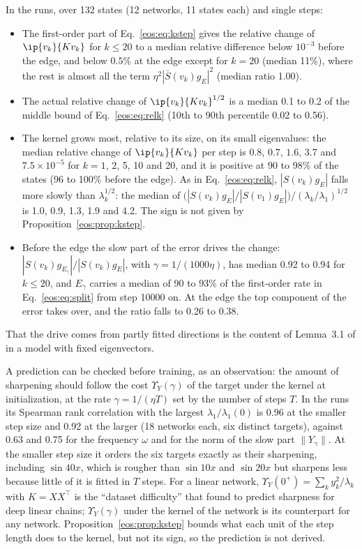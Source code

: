 In the runs, over 132 states (12 networks, 11 states each) and single steps:
\begin{itemize}
\item The first-order part of Eq.~\eqref{eos:eq:kstep} gives the relative change of $\ip{v_k}{Kv_k}$ for $k\le20$ to a median relative difference below $10^{-3}$ before the edge, and below $0.5\%$ at the edge except for $k = 20$ (median 11\%), where the rest is almost all the term $\eta^2|\bar S(v_k)g_E|^2$ (median ratio 1.00).
\item The actual relative change of $\ip{v_k}{Kv_k}^{1/2}$ is a median 0.1 to 0.2 of the middle bound of Eq.~\eqref{eos:eq:relk} (10th to 90th percentile 0.02 to 0.56).
\item The kernel grows most, relative to its size, on its small eigenvalues: the median relative change of $\ip{v_k}{Kv_k}$ per step is $0.8$, $0.7$, $1.6$, $3.7$ and $7.5\times10^{-5}$ for $k = 1$, 2, 5, 10 and 20, and it is positive at 90 to 98\% of the states (96 to 100\% before the edge). As in Eq.~\eqref{eos:eq:relk}, $|S(v_k)g_E|$ falls more slowly than $\lambda_k^{1/2}$: the median of $\big(|S(v_k)g_E|/|S(v_1)g_E|\big)\big/(\lambda_k/\lambda_1)^{1/2}$ is 1.0, 0.9, 1.3, 1.9 and 4.2. The sign is not given by Proposition~\ref{eos:prop:kstep}.
\item Before the edge the slow part of the error drives the change: $|S(v_k)g_{E_\gamma}|/|S(v_k)g_E|$, with $\gamma = 1/(1000\eta)$, has median 0.92 to 0.94 for $k\le20$, and $E_\gamma$ carries a median of 90 to 93\% of the first-order rate in Eq.~\eqref{eos:eq:split} from step 10000 on. At the edge the top component of the error takes over, and the ratio falls to 0.26 to 0.38.
\end{itemize}
That the drive comes from partly fitted directions is the content of Lemma~3.1 of \cite{liwangli2022} in a model with fixed eigenvectors.

A prediction can be checked before training, as an observation: the amount of sharpening should follow the cost $\Upsilon_Y(\gamma)$ of the target under the kernel at initialization, at the rate $\gamma = 1/(\eta T)$ set by the number of steps $T$.
In the runs its Spearman rank correlation with the largest $\lambda_1/\lambda_1(0)$ is 0.96 at the smaller step size and 0.92 at the larger (18 networks each, six distinct targets), against 0.63 and 0.75 for the frequency $\omega$ and for the norm of the slow part $\|Y_\gamma\|$.
At the smaller step size it orders the six targets exactly as their sharpening, including $\sin40x$, which is rougher than $\sin10x$ and $\sin20x$ but sharpens less because little of it is fitted in $T$ steps.
For a linear network, $\Upsilon_Y(0^+) = \sum_ky_k^2/\lambda_k$ with $K = XX^\top$ is the ``dataset difficulty'' that \cite{yoo2025} found to predict sharpness for deep linear chains; $\Upsilon_Y(\gamma)$ under the kernel of the network is its counterpart for any network.
Proposition~\ref{eos:prop:kstep} bounds what each unit of the step length does to the kernel, but not its sign, so the prediction is not derived.

